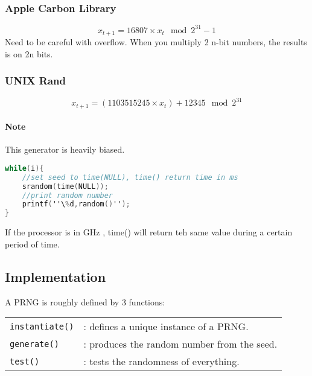 \subsubsection{Apple Carbon Library}
$$x_{t+1} = 16807 \times x_t \mod 2^{31} -1 $$
Need to be careful with overflow. When you multiply 2 n-bit numbers, the results
is on 2n bits.

\subsubsection{UNIX Rand}
$$x_{t+1} = (1103515245 \times x_t) + 12345 \mod 2^{31}$$
\paragraph{Note} This generator is heavily biased.

\begin{lstlisting}[frame=single,language=C]
while(i){
	//set seed to time(NULL), time() return time in ms
	srandom(time(NULL)); 
	//print random number
	printf(''\%d,random()'');
}
\end{lstlisting}
If the processor is in GHz , time() will return teh same value during a certain 
period of time.

\subsection{Implementation}

A PRNG is roughly defined by 3 functions: \begin{tabular}{ll}
    \texttt{instantiate()} & : defines a unique instance of a PRNG.\\
    \texttt{generate()} & :  produces the random number from the seed.\\
    \texttt{test()} & : tests the randomness of everything.\\
\end{tabular}
